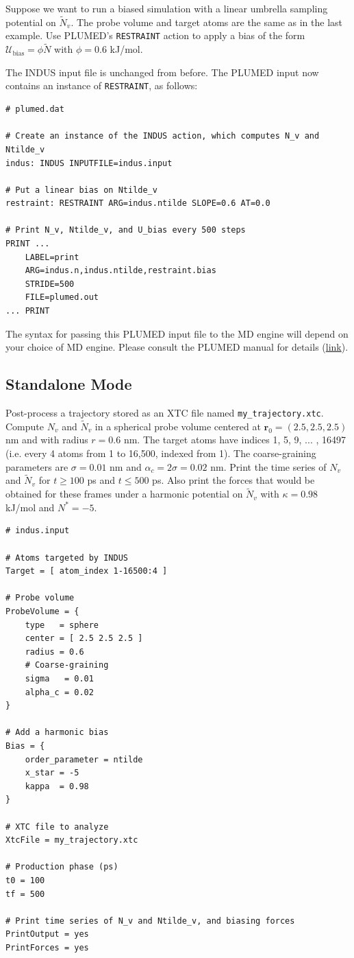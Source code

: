 \documentclass[11pt,notitlepage]{article}
\newcommand{\plumedmanual}[1][link]{\href{https://plumed.github.io/doc.html}{#1}}
\begin{document}
Suppose we want to run a biased simulation with a linear umbrella sampling potential on $\tilde{N}_v$. The probe volume and target atoms are the same as in the last example. Use PLUMED's \texttt{RESTRAINT} action to apply a bias of the form $\mathcal{U}_{\text{bias}} = \phi \tilde{N}$ with $\phi = 0.6$ kJ/mol.

The INDUS input file is unchanged from before. The PLUMED input now contains an instance of \texttt{RESTRAINT}, as follows:
\begin{lstlisting}
# plumed.dat

# Create an instance of the INDUS action, which computes N_v and Ntilde_v
indus: INDUS INPUTFILE=indus.input

# Put a linear bias on Ntilde_v
restraint: RESTRAINT ARG=indus.ntilde SLOPE=0.6 AT=0.0

# Print N_v, Ntilde_v, and U_bias every 500 steps
PRINT ...
	LABEL=print
	ARG=indus.n,indus.ntilde,restraint.bias
	STRIDE=500
	FILE=plumed.out
... PRINT
\end{lstlisting}


The syntax for passing this PLUMED input file to the MD engine will depend on your choice of MD engine. Please consult the PLUMED manual for details (\plumedmanual).


\subsection{Standalone Mode}

Post-process a trajectory stored as an XTC file named \texttt{my\_trajectory.xtc}. Compute $N_v$ and $\tilde{N}_v$ in a spherical probe volume centered at $\mathbf{r}_0 = (2.5, 2.5, 2.5)$ nm and with radius $r = 0.6$ nm. The target atoms have indices 1, 5, 9, ... , 16497 (i.e. every 4 atoms from 1 to 16,500, indexed from 1). The coarse-graining parameters are $\sigma = 0.01$ nm and $\alpha_c = 2 \sigma = 0.02$ nm. Print the time series of $N_v$ and $\tilde{N}_v$ for $t \ge 100$ ps and $t \le 500$ ps. Also print the forces that would be obtained for these frames under a harmonic potential on $\tilde{N}_v$ with $\kappa = 0.98$ kJ/mol and $N^* = -5$.

\begin{lstlisting}
# indus.input

# Atoms targeted by INDUS
Target = [ atom_index 1-16500:4 ]

# Probe volume
ProbeVolume = {
	type   = sphere
	center = [ 2.5 2.5 2.5 ]
	radius = 0.6
	# Coarse-graining
	sigma   = 0.01
	alpha_c = 0.02
}

# Add a harmonic bias
Bias = {
	order_parameter = ntilde
	x_star = -5
	kappa  = 0.98
}

# XTC file to analyze
XtcFile = my_trajectory.xtc

# Production phase (ps)
t0 = 100
tf = 500

# Print time series of N_v and Ntilde_v, and biasing forces
PrintOutput = yes
PrintForces = yes
\end{lstlisting}
\end{document}
